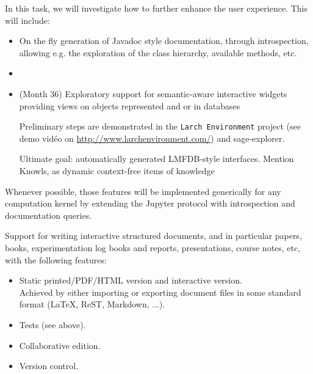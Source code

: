 \begin{workpackage}
\begin{tasklist}
\begin{task}[title=Dynamic documentation and exploration system]
  In this task, we will investigate how to further enhance the user
  experience. This will include:

  \begin{itemize}
  \item On the fly generation of Javadoc style documentation, through
    introspection, allowing e.g. the exploration of the class
    hierarchy, available methods, etc.
  \item {}
  \item {} (Month 36) Exploratory
    support for semantic-aware interactive widgets providing views on
    objects represented and or in databases

    Preliminary steps are demonstrated in the \texttt{Larch
      Environment} project (see demo vidéo on
    \url{http://www.larchenvironment.com/}) and sage-explorer.

    Ultimate goal: automatically generated LMFDB-style interfaces.
    Mention Knowls, as dynamic context-free items of knowledge
  \end{itemize}




  Whenever possible, those features will be implemented generically
  for any computation kernel by extending the Jupyter protocol with
  introspection and documentation queries.

\end{task}

\begin{task}[title=Structured documents]
  Support for writing interactive structured documents, and in
  particular papers, books, experimentation log books and reports,
  presentations, course notes, etc, with the following features:
  \begin{itemize}
  \item Static printed/PDF/HTML version and interactive version.\\
    Achieved by either importing or exporting document files in some
    standard format (LaTeX, ReST, Markdown, ...).
  \item Tests (see above).
  \item Collaborative edition.
  \item Version control.
  \end{itemize}
\end{task}
\end{tasklist}


\end{workpackage}
